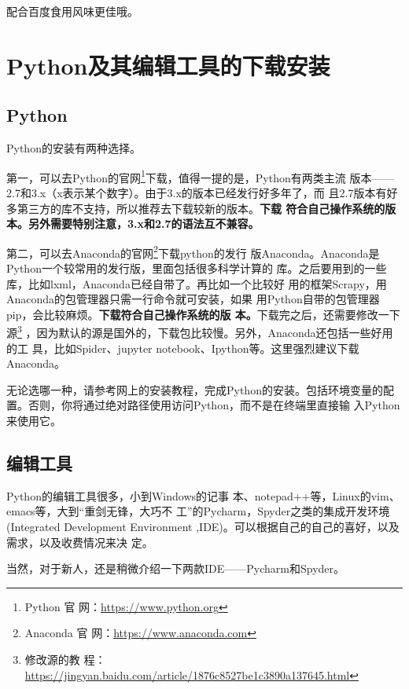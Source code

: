 \documentclass[11pt,UTF8,oneside]{mybook}
\begin{document}
配合百度食用风味更佳哦。

\tableofcontents

\mainmatter

\chapter{Python及其编辑工具的下载安装}


\section{Python}


Python的安装有两种选择。

第一，可以去Python的官网\footnote{Python 官
  网：\url{https://www.python.org}}下载，值得一提的是，Python有两类主流
版本——2.7和3.x（x表示某个数字）。由于3.x的版本已经发行好多年了，而
且2.7版本有好多第三方的库不支持，所以推荐去下载较新的版本。\textbf{下载
  符合自己操作系统的版本。另外需要特别注意，3.x和2.7的语法互不兼容。}

第二，可以去Anaconda的官网\footnote{Anaconda 官
  网：\url{https://www.anaconda.com}}下载python的发行
版Anaconda。Anaconda是Python一个较常用的发行版，里面包括很多科学计算的
库。之后要用到的一些库，比如lxml，Anaconda已经自带了。再比如一个比较好
用的框架Scrapy，用Anaconda的包管理器只需一行命令就可安装，如果
用Python自带的包管理器pip，会比较麻烦。\textbf{下载符合自己操作系统的版
  本。}下载完之后，还需要修改一下源\footnote{修改源的教
  程：
  \url{https://jingyan.baidu.com/article/1876c8527be1c3890a137645.html}}
，因为默认的源是国外的，下载包比较慢。另外，Anaconda还包括一些好用的工
具，比如Spider、jupyter notebook、Ipython等。这里强烈建议下载Anaconda。

无论选哪一种，请参考网上的安装教程，完成Python的安装。包括环境变量的配
置。否则，你将通过绝对路径使用访问Python，而不是在终端里直接输
入Python来使用它。

\section{编辑工具}

Python的编辑工具很多，小到Windows的记事
本、notepad++等，Linux的vim、emacs等，大到“重剑无锋，大巧不
工”的Pycharm，Spyder之类的集成开发环境(Integrated Development
Environment ,IDE)。可以根据自己的自己的喜好，以及需求，以及收费情况来决
定。

当然，对于新人，还是稍微介绍一下两款IDE——Pycharm和Spyder。
\end{document}
